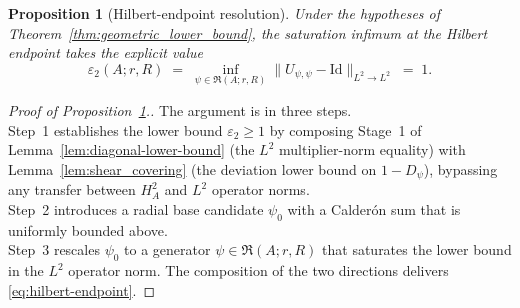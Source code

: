 \documentclass[pdflatex,sn-basic,Numbered]{sn-jnl}
\theoremstyle{thmstyleone}%
\newtheorem{proposition}{Proposition}%
\theoremstyle{thmstylethree}%
\begin{document}
\begin{proposition}[Hilbert-endpoint resolution]\label{prop:hilbert-resolution}
	Under the hypotheses of Theorem~\ref{thm:geometric_lower_bound}, the
	saturation infimum at the Hilbert endpoint takes the explicit value
	\begin{equation}\label{eq:hilbert-endpoint}
		\varepsilon_2(A; r, R)
		\;=\; \inf_{\psi \in \mathfrak{R}(A; r, R)}
		\bigl\| U_{\psi, \psi} - \mathrm{Id} \bigr\|_{L^2 \to L^2}
		\;=\; 1 .
	\end{equation}
\end{proposition}

\begin{proof}[Proof of Proposition~\ref{prop:hilbert-resolution}.]
	The argument is in three steps.\\
	Step~1 establishes the lower bound
	$\varepsilon_2 \ge 1$ by composing Stage~1 of
	Lemma~\ref{lem:diagonal-lower-bound} (the $L^2$ multiplier-norm
	equality) with Lemma~\ref{lem:shear_covering} (the deviation lower
	bound on $1 - D_\psi$), bypassing any transfer between $H^2_A$ and
	$L^2$ operator norms.\\
	Step~2 introduces a radial base candidate
	$\psi_0$ with a Calder\'on sum that is uniformly bounded above.\\
	Step~3 rescales $\psi_0$ to a generator
	$\psi \in \mathfrak{R}(A; r, R)$ that saturates the lower bound in
	the $L^2$ operator norm. The composition of the two directions
	delivers \eqref{eq:hilbert-endpoint}.
	

\end{proof}
\end{document}
